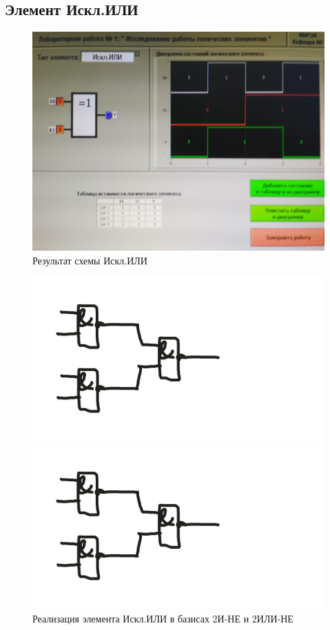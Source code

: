 \subsection{Элемент Искл.ИЛИ}

\begin{figure}[H]
	\centering
	\includegraphics[width=0.85\linewidth]{imgs/1/xor}
	\caption{Результат схемы Искл.ИЛИ}
	\label{fig:1_xor}
\end{figure}

\begin{figure}[H]
	\centering
	\begin{minipage}{.45\textwidth}
		\centering
		\includegraphics[width=0.85\linewidth]{imgs/1/xor_and}
	\end{minipage}
	\begin{minipage}{.45\textwidth}
		\centering
		\includegraphics[width=0.85\linewidth]{imgs/1/xor_or}
	\end{minipage}
	\caption{Реализация элемента Искл.ИЛИ в базисах 2И-НЕ и 2ИЛИ-НЕ}
\end{figure}